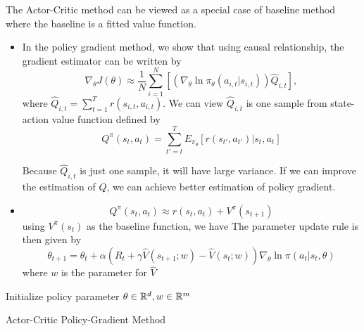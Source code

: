 \begin{refsection}
The Actor-Critic method can be viewed as a special case of baseline method where the baseline is a fitted value function. 

\begin{remark}[motivation]
	\begin{itemize}
		\item In the policy gradient method, we show that using causal relationship, the gradient estimator can be written by
		$$\nabla_{\theta}J(\theta) \approx \frac{1}{N}\sum_{i=1}^N[( \nabla_{\theta} \ln \pi_\theta(a_{i,t}|s_{i,t}))\hat{Q}_{i,t}], $$
		where
		$\hat{Q}_{i,t} = \sum_{t=1}^T r(s_{i,t}, a_{i,t}).$
		We can view $\hat{Q}_{i,t}$ is one sample from state-action value function defined by $$Q^\pi(s_t,a_t) = \sum_{t'=t}^T E_{\pi_{\theta}}[r(s_{t'},a_{t'})|s_t,a_t]$$
		
		Because $\hat{Q}_{i,t}$ is just one sample, it will have large variance. If we can improve the estimation of $Q$, we can achieve better estimation of policy gradient.
		\item 
		$$Q^\pi(s_t,a_t) \approx r(s_t,a_t) + V^\pi(s_{t+1})$$
		using  $V^\pi(s_{t})$ as the baseline function, we have
		The parameter update rule is then given by
		$$\theta_{t+1} = \theta_t + \alpha(R_t + \gamma \hat{V}(s_{t+1};w) - \hat{V}(s_t;w))\nabla_{\theta}\ln \pi(a_t|s_t,\theta) $$
		where $w$ is the parameter for $\hat{V}$
	\end{itemize}	
\end{remark}



\begin{algorithm}
	Initialize policy parameter $\theta\in \mathbb{R}^d, w\in \mathbb{R}^m$\\
	\caption{Actor-Critic Policy-Gradient Method}
\end{algorithm}




\end{refsection}
